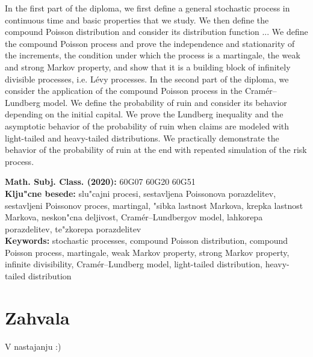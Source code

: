 \documentclass[12pt, a4paper, reqno]{amsart}
\theoremstyle{definition}
\theoremstyle{plain}
\newcommand{\1}{\mathds{1}}
\begin{document}
In the first part of the diploma, we first define a general stochastic process in continuous time and basic
properties that we study. We then define the compound Poisson distribution and consider its distribution
function ... We define the compound Poisson process and prove the independence and stationarity of the increments,
the condition under which the process is a martingale, the weak and strong Markov property, and show that it is a building
block of infinitely divisible processes, i.e. Lévy processes.
In the second part of the diploma, we consider the application of the compound Poisson process in the Cramér--Lundberg model. 
We define the probability of ruin and consider its behavior depending on the initial capital. 
We prove the Lundberg inequality and the asymptotic behavior of the probability of ruin when claims 
are modeled with light-tailed and heavy-tailed distributions. We practically demonstrate the behavior 
of the probability of ruin at the end with repeated simulation of the risk process.


\vfill\noindent
{\bf Math. Subj. Class. (2020):} 60G07 60G20 60G51 \\[1mm]
{\bf Klju"cne besede:} slu"cajni procesi, sestavljena Poissonova porazdelitev, sestavljeni Poissonov proces, martingal, 
"sibka lastnost Markova, krepka lastnost Markova,
neskon"cna deljivost, Cramér--Lundbergov model, lahkorepa porazdelitev, te"zkorepa porazdelitev\\[1mm]
{\bf Keywords:} stochastic processes, compound Poisson distribution, compound Poisson process, 
martingale, weak Markov property, strong Markov property, infinite divisibility,
Cramér--Lundberg model, light-tailed distribution, heavy-tailed distribution
\pagebreak


\section*{Zahvala}
V nastajanju :)
%
\pagebreak
\end{document}

